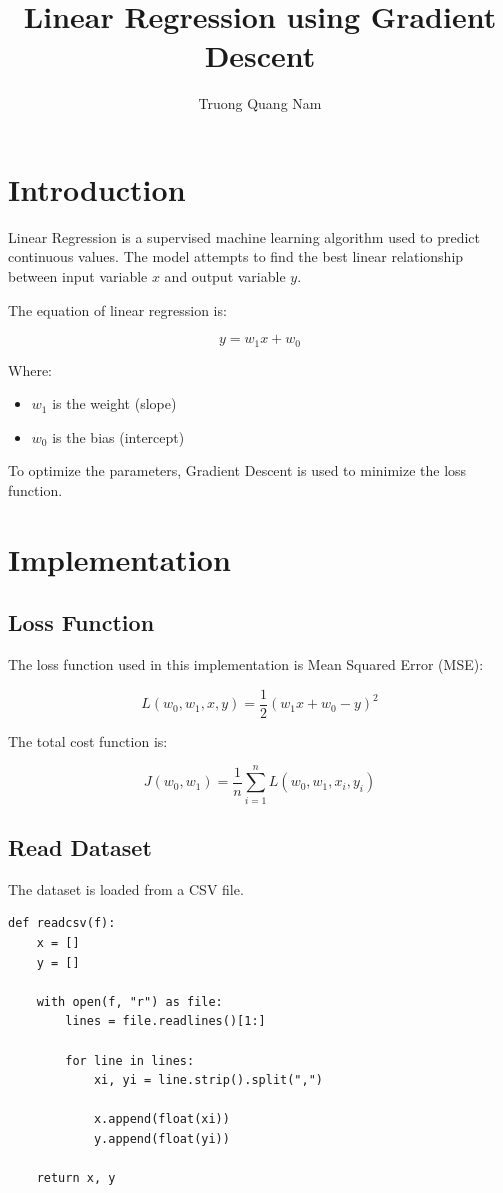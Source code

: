 \documentclass{article}
\title{Linear Regression using Gradient Descent}
\author{Truong Quang Nam}
\begin{document}
\maketitle

\section{Introduction}

Linear Regression is a supervised machine learning algorithm used to predict continuous values. The model attempts to find the best linear relationship between input variable $x$ and output variable $y$.

The equation of linear regression is:

\[
y = w_1x + w_0
\]

Where:

\begin{itemize}
    \item $w_1$ is the weight (slope)
    \item $w_0$ is the bias (intercept)
\end{itemize}

To optimize the parameters, Gradient Descent is used to minimize the loss function.

\section{Implementation}

\subsection{Loss Function}

The loss function used in this implementation is Mean Squared Error (MSE):

\[
L(w_0,w_1,x,y) = \frac{1}{2}(w_1x + w_0 - y)^2
\]

The total cost function is:

\[
J(w_0,w_1) = \frac{1}{n}\sum_{i=1}^{n}L(w_0,w_1,x_i,y_i)
\]

\subsection{Read Dataset}

The dataset is loaded from a CSV file.

\begin{lstlisting}
def readcsv(f):
    x = []
    y = []

    with open(f, "r") as file:
        lines = file.readlines()[1:]

        for line in lines:
            xi, yi = line.strip().split(",")

            x.append(float(xi))
            y.append(float(yi))

    return x, y
\end{lstlisting}
\end{document}
